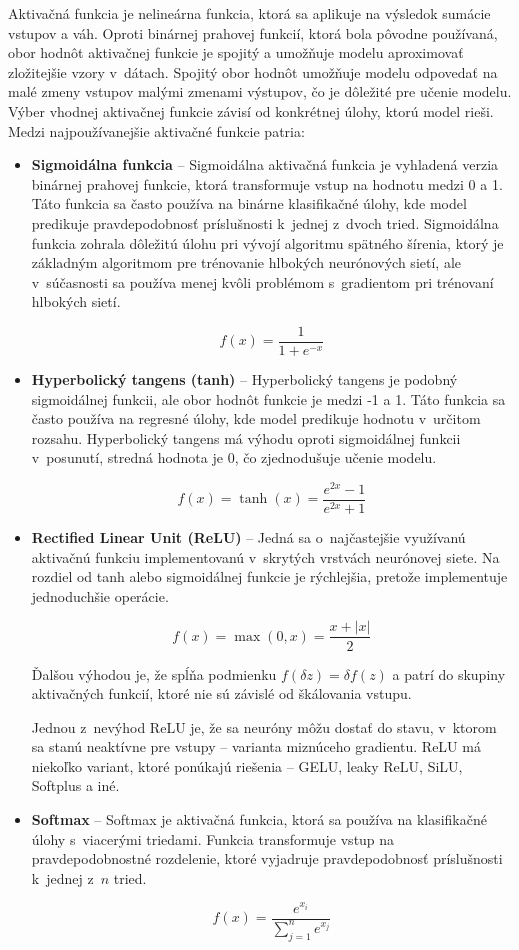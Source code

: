 Aktivačná funkcia je nelineárna funkcia, ktorá sa aplikuje na výsledok sumácie vstupov a váh. Oproti binárnej prahovej funkcií, ktorá bola pôvodne používaná, obor hodnôt aktivačnej funkcie je spojitý a umožňuje modelu aproximovať zložitejšie vzory v~dátach. Spojitý obor hodnôt umožňuje modelu odpovedať na malé zmeny vstupov malými zmenami výstupov, čo je dôležité pre učenie modelu. Výber vhodnej aktivačnej funkcie závisí od konkrétnej úlohy, ktorú model rieši. Medzi najpoužívanejšie aktivačné funkcie patria:
\begin{itemize}
    \item \textbf{Sigmoidálna funkcia} -- Sigmoidálna aktivačná funkcia je vyhladená verzia binárnej prahovej funkcie, ktorá transformuje vstup na hodnotu medzi 0 a 1. Táto funkcia sa často používa na binárne klasifikačné úlohy, kde model predikuje pravdepodobnosť príslušnosti k~jednej z~dvoch tried. Sigmoidálna funkcia zohrala dôležitú úlohu pri vývojí algoritmu spätného šírenia, ktorý je základným algoritmom pre trénovanie hlbokých neurónových sietí, ale v~súčasnosti sa používa menej kvôli problémom s~gradientom pri trénovaní hlbokých sietí.

    $$f(x) = \frac{1}{1 + e^{-x}}$$
    
    \item \textbf{Hyperbolický tangens (tanh)} -- Hyperbolický tangens je podobný sigmoidálnej funkcii, ale obor hodnôt funkcie je medzi -1 a 1. Táto funkcia sa často používa na regresné úlohy, kde model predikuje hodnotu v~určitom rozsahu. Hyperbolický tangens má výhodu oproti sigmoidálnej funkcii v~posunutí, stredná hodnota je 0, čo zjednodušuje učenie modelu.

    $$f(x) = \tanh(x) = \frac{e^{2x}-1}{e^{2x}+1}$$
    
    \item \textbf{Rectified Linear Unit (ReLU)} -- Jedná sa o~najčastejšie využívanú aktivačnú funkciu implementovanú v~skrytých vrstvách neurónovej siete. Na rozdiel od \textup{tanh} alebo sigmoidálnej funkcie je rýchlejšia, pretože implementuje jednoduchšie operácie.
    
    $$f(x) = \max(0, x) = \frac{x + \left|x\right|}{2}$$
    
    Ďalšou výhodou je, že spĺňa podmienku $ f(\delta z) = \delta f(z)$ a patrí do skupiny aktivačných funkcií, ktoré nie sú závislé od škálovania vstupu.

    Jednou z~nevýhod \textup{ReLU} je, že sa neuróny môžu dostať do stavu, v~ktorom sa stanú neaktívne pre  vstupy -- varianta miznúceho gradientu. \textup{ReLU} má niekoľko variant, ktoré ponúkajú riešenia -- \textup{GELU}, \textup{leaky ReLU}, \textup{SiLU}, \textup{Softplus} a iné.
    
    \item \textbf{Softmax} -- Softmax je aktivačná funkcia, ktorá sa používa na klasifikačné úlohy s~viacerými triedami. Funkcia transformuje vstup na pravdepodobnostné rozdelenie, ktoré vyjadruje pravdepodobnosť príslušnosti k~jednej z~$n$ tried.

    $$f(x) = \frac{e^{x_i}}{\sum_{j=1}^{n}e^{x_j}}$$
    
\end{itemize}

